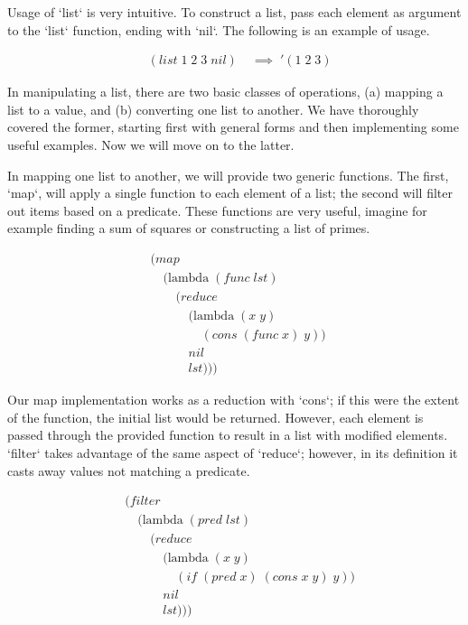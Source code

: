 Usage of `list` is very intuitive. To construct a list, pass each element as 
argument to the `list` function, ending with `nil`. The following is an example of 
usage.   

\begin{align*}
& (list \; 1 \; 2 \; 3 \; nil) \; &\implies \; '(1 \; 2 \; 3)
\end{align*}

In manipulating a list, there are two basic classes of operations, (a) mapping a 
list to a value, and (b) converting one list to another. We have thoroughly 
covered the former, starting first with general forms and then implementing some 
useful examples. Now we will move on to the latter.

In mapping one list to another, we will provide two generic functions. The first, 
`map`, will apply a single function to each element of a list; the second will 
filter out items based on a predicate. These functions are very useful, imagine 
for example finding a sum of squares or constructing a list of primes.

\begin{align*}
& (map \; 
\\& \quad (\text{lambda} \; (func \; lst)
\\& \qquad (reduce
\\& \qquad \quad (\text{lambda} \; (x \; y) \; 
\\& \qquad \qquad (cons \; (func \; x) \; y)) \; 
\\& \qquad \quad nil
\\& \qquad \quad lst)))
\end{align*}

Our map implementation works as a reduction with `cons`; if this were the extent 
of the function, the initial list would be returned. However, each element is 
passed through the provided function to result in a list with modified elements. 
`filter` takes advantage of the same aspect of `reduce`; however, in its 
definition it casts away values not matching a predicate.

\begin{align*}
& (filter \; 
\\& \quad (\text{lambda} \; (pred \; lst)
\\& \qquad (reduce
\\& \qquad \quad (\text{lambda} \; (x \; y)
\\& \qquad \qquad (if \; (pred \; x) \; (cons \; x \; y) \; y))
\\& \qquad \quad nil
\\& \qquad \quad lst)))
\end{align*}

